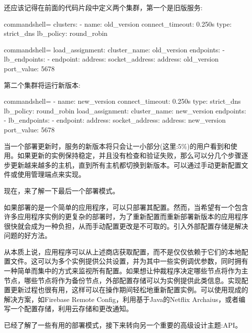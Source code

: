 还应该记得在前面的代码片段中定义两个集群，第一个是旧版服务:

\begin{tcblisting}{commandshell={}}
clusters:
  - name: old_version
    connect_timeout: 0.250s
    type: strict_dns
    lb_policy: round_robin
\end{tcblisting}
\begin{tcblisting}{commandshell={}}
    load_assignment:
      cluster_name: old_version
      endpoints:
        - lb_endpoints:
          - endpoint:
            address:
              socket_address:
                address: old_version
                port_value: 5678

\end{tcblisting}

第二个集群将运行新版本:

\begin{tcblisting}{commandshell={}}
- name: new_version
  connect_timeout: 0.250s
  type: strict_dns
  lb_policy: round_robin
  load_assignment:
    cluster_name: new_version
    endpoints:
      - lb_endpoints:
        - endpoint:
            address:
              socket_address:
                address: new_version
                port_value: 5678
\end{tcblisting}

当一个部署更新时，服务的新版本将只会让一小部分(这里:5\%)的用户看到和使用。如果更新的实例保持稳定，并且没有检查和验证失败，那么可以分几个步骤逐步更新越来越多的主机，直到所有主机都切换到新版本。可以通过手动更新配置文件或使用管理端点来实现。

现在，来了解一下最后一个部署模式。


如果部署的是一个简单的应用程序，可以只部署其配置。然而，当希望有一个包含许多应用程序实例的更复杂的部署时，为了重新配置而重新部署新版本的应用程序很快就会成为一种负担，从而手动配置更改是不可取的。引入外部配置存储是解决问题的好方法。

从本质上说，应用程序可以从上述商店获取配置，而不是仅仅依赖于它们的本地配置文件。这可以为多个实例提供公共设置，并为其中一些实例调优参数，同时拥有一种简单而集中的方式来监视所有配置。如果想让仲裁程序决定哪些节点将作为主节点，哪些节点将作为备份节点，外部配置存储可以为实例提供此类信息。实现配置更新过程也很有用，这样可以在操作期间轻松地重新配置实例。可以使用现成的解决方案，如Firebase Remote Config，利用基于Java的Netflix Archaius，或者编写一个配置存储，利用云存储和更改通知。

已经了解了一些有用的部署模式，接下来转向另一个重要的高级设计主题:API。



























